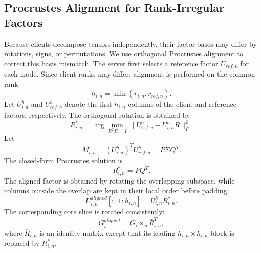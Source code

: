 \documentclass[conference]{IEEEtran}
\begin{document}
\subsection{Procrustes Alignment for Rank-Irregular Factors}
Because clients decompose tensors independently, their factor bases may differ by rotations, signs, or permutations. We use orthogonal Procrustes alignment \cite{gower1975procrustes} to correct this basis mismatch. 
The server first selects a reference factor $U_{ref,n}$ for each mode. Since client ranks may differ, alignment is performed on the common rank
\begin{equation}
    h_{i,n}=\min(r_{i,n},r_{ref,n}).
\end{equation}
Let $U_{i,n}^{h}$ and $U_{ref,n}^{h}$ denote the first $h_{i,n}$ columns of the client and reference factors, respectively. The orthogonal rotation is obtained by
\begin{equation}
    R_{i,n}^{*}=
    \arg\min_{R^TR=I}
    \|U_{ref,n}^{h}-U_{i,n}^{h}R\|_F^2.
    \label{eq:procrustes}
\end{equation}
Let
\begin{equation}
    M_{i,n}=(U_{i,n}^{h})^{T}U_{ref,n}^{h}=P\Sigma Q^T.
\end{equation}
The closed-form Procrustes solution is
\begin{equation}
    R_{i,n}^{*}=PQ^T.
    \label{eq:rotation}
\end{equation}
The aligned factor is obtained by rotating the overlapping subspace, while columns outside the overlap are kept in their local order before padding:
\begin{equation}
    U_{i,n}^{aligned}[:,1:h_{i,n}]=U_{i,n}^{h}R_{i,n}^{*}.
\end{equation}
The corresponding core slice is rotated consistently:
\begin{equation}
    G_i^{aligned}=G_i\times_n \bar{R}_{i,n}^{T},
    \label{eq:align}
\end{equation}
where $\bar{R}_{i,n}$ is an identity matrix except that its leading $h_{i,n}\times h_{i,n}$ block is replaced by $R_{i,n}^{*}$.
\end{document}
